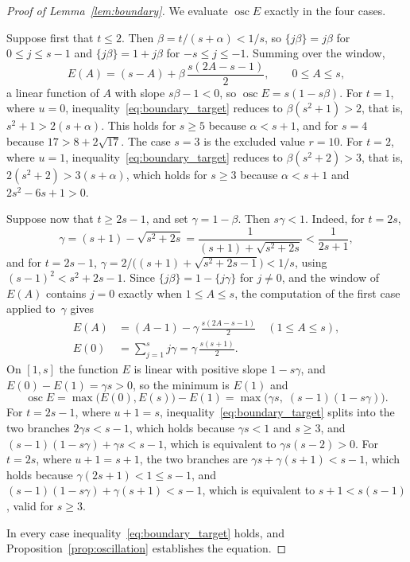 \documentclass{birkjour}
\theoremstyle{definition}
\theoremstyle{remark}
\newcommand{\frc}[1]{\{ #1 \}}
\begin{document}
\begin{proof}[Proof of Lemma~\ref{lem:boundary}]
We evaluate $\operatorname{osc}E$ exactly in the four cases.

Suppose first that $t\le 2$. Then
$\beta=t/(s+\alpha)<1/s$, so $\frc{j\beta}=j\beta$ for
$0\le j\le s-1$ and $\frc{j\beta}=1+j\beta$ for
$-s\le j\le-1$. Summing over the window,
\[
  E(A)=(s-A)+\beta\,\frac{s(2A-s-1)}{2},
  \qquad 0\le A\le s,
\]
a linear function of $A$ with slope $s\beta-1<0$, so
$\operatorname{osc}E=s(1-s\beta)$. For $t=1$, where $u=0$,
inequality~\eqref{eq:boundary_target} reduces to
$\beta(s^{2}+1)>2$, that is, $s^{2}+1>2(s+\alpha)$. This
holds for $s\ge 5$ because $\alpha<s+1$, and for $s=4$
because $17>8+2\sqrt{17}$. The case $s=3$ is the excluded
value $r=10$. For $t=2$, where $u=1$,
inequality~\eqref{eq:boundary_target} reduces to
$\beta(s^{2}+2)>3$, that is, $2(s^{2}+2)>3(s+\alpha)$,
which holds for $s\ge 3$ because $\alpha<s+1$ and
$2s^{2}-6s+1>0$.

Suppose now that $t\ge 2s-1$, and set $\gamma=1-\beta$.
Then $s\gamma<1$. Indeed, for $t=2s$,
\[
  \gamma=(s+1)-\sqrt{s^{2}+2s}
  =\frac{1}{(s+1)+\sqrt{s^{2}+2s}}<\frac{1}{2s+1},
\]
and for $t=2s-1$,
$\gamma=2/\bigl((s+1)+\sqrt{s^{2}+2s-1}\bigr)<1/s$, using
$(s-1)^{2}<s^{2}+2s-1$. Since
$\frc{j\beta}=1-\frc{j\gamma}$ for $j\neq 0$, and the
window of $E(A)$ contains $j=0$ exactly when
$1\le A\le s$, the computation of the first case applied
to~$\gamma$ gives
\[
  \begin{aligned}
    E(A)&=(A-1)-\gamma\,\frac{s(2A-s-1)}{2}
    \quad(1\le A\le s),\\
    E(0)&=\sum_{j=1}^{s}j\gamma=\gamma\,\frac{s(s+1)}{2}.
  \end{aligned}
\]
On $[1,s]$ the function $E$ is linear with positive slope
$1-s\gamma$, and $E(0)-E(1)=\gamma s>0$, so the minimum is
$E(1)$ and
\[
  \operatorname{osc}E
  =\max\bigl(E(0),E(s)\bigr)-E(1)
  =\max\bigl(\gamma s,\;(s-1)(1-s\gamma)\bigr).
\]
For $t=2s-1$, where $u+1=s$,
inequality~\eqref{eq:boundary_target} splits into the two
branches $2\gamma s<s-1$, which holds because $\gamma s<1$
and $s\ge 3$, and
$(s-1)(1-s\gamma)+\gamma s<s-1$, which is equivalent to
$\gamma s(s-2)>0$. For $t=2s$, where $u+1=s+1$, the two
branches are $\gamma s+\gamma(s+1)<s-1$, which holds
because $\gamma(2s+1)<1\le s-1$, and
$(s-1)(1-s\gamma)+\gamma(s+1)<s-1$, which is equivalent to
$s+1<s(s-1)$, valid for $s\ge 3$.

In every case inequality~\eqref{eq:boundary_target} holds,
and Proposition~\ref{prop:oscillation} establishes the equation.
\end{proof}
\end{document}
